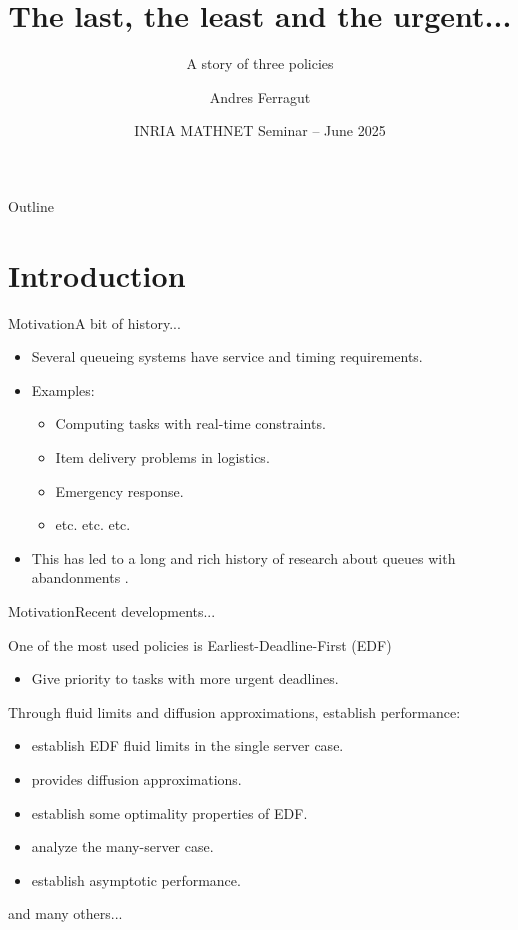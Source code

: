 \documentclass[aspectratio=169]{beamer}
\title{The last, the least and the urgent...}
\subtitle{A story of three policies}
\author[Andres Ferragut, Universidad ORT Uruguay]{Andres Ferragut}
\institute{Joint work with Diego Goldsztajn and Fernando Paganini\\ \smallskip Universidad ORT Uruguay}
\date[INRIA MATHNET Seminar -- Jun 2025]{INRIA MATHNET Seminar -- June 2025}
\renewcommand{\cite}{\citep}
\newenvironment*{myitem}[1][1.5em]{\begin{itemize}\setlength{\itemsep}{#1}}{\end{itemize}}
\begin{document}
\frame[plain]{\titlepage}

\begin{frame}{Outline}
\tableofcontents
\end{frame}

\section{Introduction}

\begin{frame}{Motivation}{A bit of history...}

	\begin{myitem}
		\item Several queueing systems have service and \alert{timing} requirements.
		\item Examples:
		\begin{itemize}
			\item Computing tasks with real-time constraints.
			\item Item delivery problems in logistics.
			\item Emergency response.
			\item etc. etc. etc.
		\end{itemize}
		\item This has led to a long and rich history of research about \alert{queues with abandonments} \cite{barrer1957queuing,stanford1979reneging,baccellietal1984single}.
	\end{myitem}

\end{frame}

\begin{frame}{Motivation}{Recent developments...}

	One of the most used policies is \alert{Earliest-Deadline-First (EDF)}
	\begin{itemize}
		\item Give priority to tasks with more urgent deadlines.
	\end{itemize}
	\vfill
	\pause
	
	Through fluid limits and diffusion approximations, establish performance:
	\begin{itemize}
		\item \cite{decreusefondmoyal2005fluid} establish EDF fluid limits in the single server case.
		\item \cite{kruketal2011heavy} provides diffusion approximations.
		\item \cite{moyal2013queues} establish some optimality properties of EDF.
		\item \cite{kangramanan2010fluid, kangramanan2012asymptotic} analyze the many-server case.
		\item \cite{ataretal2018law,ataretal2023long} establish asymptotic performance.
	\end{itemize}
	\vfill
	and many others...
\end{frame}
\end{document}
